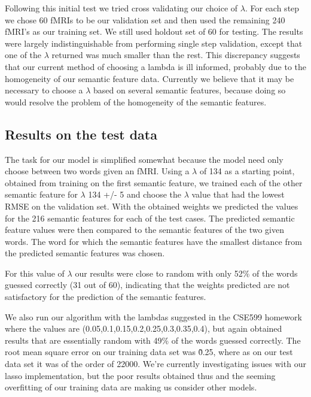 \documentclass{article} %
\begin{document}
Following this initial test we tried cross validating our choice of $\lambda$. For each step we chose 60 fMRIs to be our validation set and then used the remaining 240 fMRI's as our training set. We still used holdout set of 60 for testing. The results were largely indistinguishable from performing single step validation, except that one of the $\lambda$ returned was much smaller than the rest. This discrepancy suggests that our current method of choosing a lambda is ill informed, probably due to the homogeneity of our semantic feature data. Currently we believe that it may be necessary to choose a $\lambda$ based on several semantic features, because doing so would resolve the problem of the homogeneity of the semantic features.







\subsection{Results on the test data}

The task for our model is simplified somewhat because the model need only choose between two words given an fMRI. Using a $\lambda$ of 134 as a starting point, obtained from training on the first semantic feature, we trained each of the other semantic feature for $\lambda$ 134 +/- 5 and choose the $\lambda$ value that had the lowest RMSE on the validation set. With the obtained weights we predicted the values for the 216 semantic features for each of the test cases. The predicted semantic feature values were then compared to the semantic features of the two given words. The word for which the semantic features have the smallest distance from the predicted semantic features was chosen. 

For this value of $\lambda$ our results were close to random with only 52\% of the words guessed correctly (31 out of 60), indicating that the weights predicted are not satisfactory for the prediction of the semantic features.

We also run our algorithm with the lambdas suggested in the CSE599 homework where the values are (0.05,0.1,0.15,0.2,0.25,0.3,0.35,0.4), but again obtained results that are essentially random with 49\% of the words guessed correctly. The root mean square error on our training data set was \~0.25, where as on our test data set it was of the order of 22000. We're currently investigating issues with our lasso implementation, but the poor results obtained thus and the seeming overfitting of our training data are making us consider other models.
\end{document}
